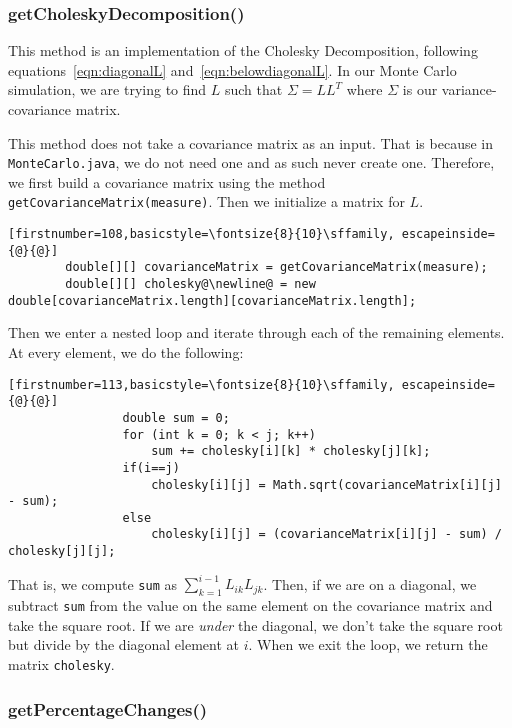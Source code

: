 \documentclass[../Dissertation.tex]{subfiles}
\begin{document}
\subsubsection{getCholeskyDecomposition()}

This method is an implementation of the Cholesky Decomposition, following equations~\ref{eqn:diagonalL} and~\ref{eqn:belowdiagonalL}.
In our Monte Carlo simulation, we are trying to find $L$ such that $\Sigma = LL^T$ where $\Sigma$ is our variance-covariance matrix.

This method does not take a covariance matrix as an input. 
That is because in \lstinline|MonteCarlo.java|, we do not need one and as such never create one.
Therefore, we first build a covariance matrix using the method \lstinline|getCovarianceMatrix(measure)|.
Then we initialize a matrix for $L$.
\begin{lstlisting}[firstnumber=108,basicstyle=\fontsize{8}{10}\sffamily, escapeinside={@}{@}]
		double[][] covarianceMatrix = getCovarianceMatrix(measure);
		double[][] cholesky@\newline@ = new double[covarianceMatrix.length][covarianceMatrix.length];
\end{lstlisting}

Then we enter a nested loop and iterate through each of the remaining elements.
At every element, we do the following:
\begin{lstlisting}[firstnumber=113,basicstyle=\fontsize{8}{10}\sffamily, escapeinside={@}{@}]
                double sum = 0;
                for (int k = 0; k < j; k++)
                    sum += cholesky[i][k] * cholesky[j][k];
                if(i==j)
                    cholesky[i][j] = Math.sqrt(covarianceMatrix[i][j] - sum);
                else
                    cholesky[i][j] = (covarianceMatrix[i][j] - sum) / cholesky[j][j];
\end{lstlisting}
That is, we compute \lstinline|sum| as $\sum_{k=1}^{i-1}L_{ik}L_{jk}$.
Then, if we are on a diagonal, we subtract \lstinline|sum| from the value on the same element on the covariance matrix and take the square root.
If we are \textit{under} the diagonal, we don't take the square root but divide by the diagonal element at $i$.
When we exit the loop, we return the matrix \lstinline|cholesky|.

\subsubsection{getPercentageChanges()}
\end{document}
